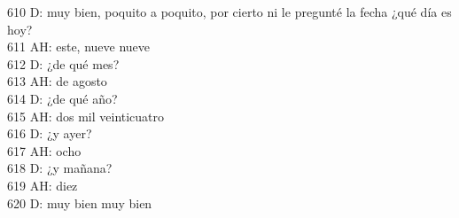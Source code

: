 610 D: muy bien, poquito a poquito, por cierto ni le pregunté la fecha ¿qué día es hoy?\\
611 AH: este, nueve nueve\\
612 D: ¿de qué mes?\\
613 AH: de agosto\\
614 D: ¿de qué año?\\
615 AH: dos mil veinticuatro\\
616 D: ¿y ayer?\\
617 AH: ocho\\
618 D: ¿y mañana?\\
619 AH: diez\\
620 D: muy bien muy bien\\

